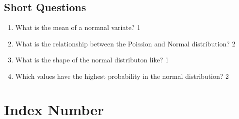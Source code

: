 \documentclass[a4paper,oneside, margin=1.4in]{book}
\begin{document}
\section{Short Questions}
  \begin{enumerate}
      \item
	What is the mean of  a normnal variate? \hfill 1
    \item
	What is the relationship between the Poission and Normal distribution? \hfill 2
    \item
	What is the shape of the normal distributon like? \hfill 1
    \item
	Which values have the highest probability in the normal distribution? \hfill 2
	 \end{enumerate}
	
\chapter{Index Number} 
\end{document}
